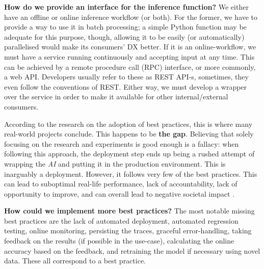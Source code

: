 \begin{displayquote}
\textbf{How do we provide an interface for the inference function?} We either have an offline or online inference workflow (or both). For the former, we have to provide a way to use it in batch processing; a simple Python function may be adequate for this purpose, though, allowing it to be easily (or automatically) parallelised would make its consumers' DX better. If it is an online-workflow, we must have a service running continuously and accepting input at any time. This can be achieved by a remote procedure call (RPC) interface, or more commonly, a web API. Developers usually refer to these as REST API-s, sometimes, they even follow the conventions of REST. Either way, we must develop a wrapper over the service in order to make it available for other internal/external consumers.
\end{displayquote}

According to the research on the adoption of best practices, this is where many real-world projects conclude. This happens to be \textbf{the gap}. Believing that solely focusing on the research and experiments is good enough is a fallacy: when following this approach, the deployment step ends up being a rushed attempt of wrapping the \textit{AI} and putting it in the production environment. This is inarguably a deployment. However, it follows very few of the best practices. This can lead to suboptimal real-life performance, lack of accountability, lack of opportunity to improve, and can overall lead to negative societal impact \cite{o2016weapons}.

\begin{displayquote}
\textbf{How could we implement more best practices?} The most notable missing best practices are the lack of automated deployment, automated regression testing, online monitoring, persisting the traces, graceful error-handling, taking feedback on the results (if possible in the use-case), calculating the online accuracy based on the feedback, and retraining the model if necessary using novel data. These all correspond to a best practice.
\end{displayquote}
